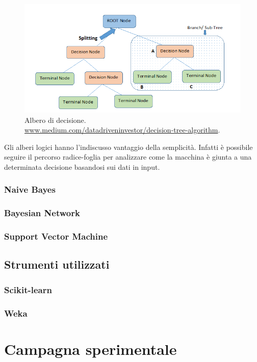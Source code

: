\documentclass[oneside]{book}
\begin{document}
\begin{figure}[!h]
	\centering
	\includegraphics[width=13cm]{assets/decision_tree.png}
	\caption{Albero di decisione. \\ \url{www.medium.com/datadriveninvestor/decision-tree-algorithm}.}
	\label{fig:decision-tree}
\end{figure}

Gli alberi logici hanno l'indiscusso vantaggio della semplicità. Infatti è possibile seguire il percorso radice-foglia per analizzare come la macchina è giunta a una determinata decisione basandosi sui dati in input.


\subsection{Naive Bayes}

\subsection{Bayesian Network}
\subsection{Support Vector Machine}


\section{Strumenti utilizzati}
\subsection{Scikit-learn}
\subsection{Weka}




\chapter{Campagna sperimentale}
\end{document}
